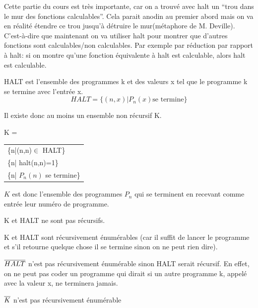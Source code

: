 \begin{myrem}
	Cette partie du cours est très importante, car on a trouvé avec halt un ``trou dans le mur des fonctions calculables''. Cela parait anodin au premier abord mais on va en réalité étendre ce trou jusqu'à détruire le mur(métaphore
	de M. Deville). C'est-à-dire que maintenant on va utiliser halt pour montrer que d'autres fonctions sont calculables/non calculables. Par exemple	par réduction par rapport à halt: si on montre qu'une fonction équivalente à halt est calculable, alors halt est calculable.
\end{myrem}

\begin{mydef}[HALT]
	HALT est l'ensemble des programmes k et des valeurs x tel que le programme k se termine avec l'entrée x.
	\[ HALT = \{(n,x)|P_n(x)\text{se termine}\}\]
\end{mydef}

Il existe donc au moins un ensemble non récursif
K.

\begin{mydef}[K]
	K =
	\begin{tabular}{l}
		\{n|(n,n)$\in$ HALT\}\\
		\{n| halt(n,n)=1\}\\
		\{n| $P_n(n)$ se termine\}
	\end{tabular}

	$K$ est donc l'ensemble des programmes $P_n$ qui se terminent en recevant comme entrée leur numéro de programme.
\end{mydef}

\begin{myprop}
	K et HALT ne sont pas récursifs.
\end{myprop}

\begin{myprop}
	K et HALT sont récursivement énumérables (car il suffit de lancer le programme et s’il retourne quelque chose il se termine sinon on ne peut rien dire).
\end{myprop}

\begin{myprop}
	$\overline{HALT}$ n'est pas récursivement énumérable sinon HALT serait récursif.  En effet, on ne peut pas coder un programme qui dirait si un autre programme k, appelé avec la valeur x, ne terminera jamais.
\end{myprop}

\begin{myprop}
	$\overline{K}$ n'est pas récursivement énumérable
\end{myprop}

